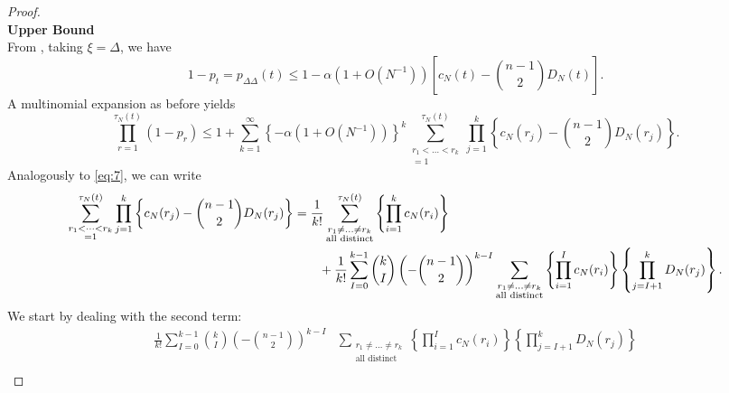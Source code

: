 \documentclass{article}
\newcommand{\E}{\mathbb{E}}
\newcommand{\1}[1]{\mathbb{I}_{#1}}
\begin{document}
\begin{proof}
\textbf{\\Upper Bound}\\
From \citet[Lemma 1 Case 1]{koskela2018}, taking $\xi=\Delta$, we have
\begin{equation}
1-p_t = p_{\Delta\Delta}(t) \leq 1 - \alpha (1+O(N^{-1})) \left[ c_N(t) - \binom{n-1}{2} D_N(t) \right] .
\end{equation}
A multinomial expansion as before yields
\begin{equation}
\prod_{r=1}^{\tau_N(t)} (1-p_r)
\leq 1 + \sum_{k=1}^\infty \left\{- \alpha (1+O(N^{-1}))\right\}^k \sum_{\substack{r_1<\dots<r_k \\ =1}}^{\tau_N(t)}\prod_{j=1}^k 
\left\{ c_N(r_j) - \binom{n-1}{2} D_N(r_j) \right\} .
\end{equation}
Analogously to \eqref{eq:7}, we can write
\begin{align}
\sum_{\substack{r_1<\dots<r_k \\ =1}}^{\tau_N(t)}\prod_{j=1}^k 
\left\{ c_N(r_j) - \binom{n-1}{2} D_N(r_j) \right\}
&= \frac{1}{k!} \sum_{\substack{r_1\neq\dots\neq r_k \\ \text{all distinct}}}^{\tau_N(t)}
\left\{ \prod_{i=1}^k c_N(r_i) \right\} \label{eq:18}\\
&\qquad + \frac{1}{k!} \sum_{I=0}^{k-1} \binom{k}{I} \left( -\binom{n-1}{2} \right)^{k-I}
\sum_{\substack{r_1\neq\dots\neq r_k \\ \text{all distinct}}}
\left\{ \prod_{i=1}^I c_N(r_i) \right\}
\left\{ \prod_{j=I+1}^k D_N(r_j) \right\} .\notag
\end{align}
We start by dealing with the second term:
\begin{align*}
\frac{1}{k!} \sum_{I=0}^{k-1} \binom{k}{I} \left( -\binom{n-1}{2} \right)^{k-I}
&\sum_{\substack{r_1\neq\dots\neq r_k \\ \text{all distinct}}}
\left\{ \prod_{i=1}^I c_N(r_i) \right\}
\left\{ \prod_{j=I+1}^k D_N(r_j) \right\} \\

\end{align*}
\end{proof}
\end{document}
